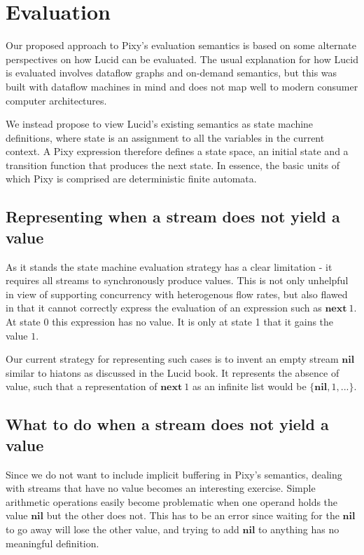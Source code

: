 \documentclass{scrartcl}
\begin{document}
    \section{Evaluation}

    Our proposed approach to Pixy's evaluation semantics is based on some alternate perspectives on how Lucid can be evaluated. The usual explanation for how Lucid is evaluated involves dataflow graphs and on-demand semantics, but this was built with dataflow machines in mind and does not map well to modern consumer computer architectures.

    We instead propose to view Lucid's existing semantics as state machine definitions, where state is an assignment to all the variables in the current context. A Pixy expression therefore defines a state space, an initial state and a transition function that produces the next state. In essence, the basic units of which Pixy is comprised are deterministic finite automata.
    
    \subsection{Representing when a stream does not yield a value}
    
    As it stands the state machine evaluation strategy has a clear limitation - it requires all streams to synchronously produce values. This is not only unhelpful in view of supporting concurrency with heterogenous flow rates, but also flawed in that it cannot correctly express the evaluation of an expression such as $\textbf{next}\ 1$. At state 0 this expression has no value. It is only at state 1 that it gains the value $1$.
    
    Our current strategy for representing such cases is to invent an empty stream $\textbf{nil}$ similar to hiatons as discussed in the Lucid book. It represents the absence of value, such that a representation of $\textbf{next}\ 1$ as an infinite list would be $\{\textbf{nil}, 1, ...\}$.
    
    \subsection{What to do when a stream does not yield a value}
    
    \label{subsec:async}
    
    Since we do not want to include implicit buffering in Pixy's semantics, dealing with streams that have no value becomes an interesting exercise. Simple arithmetic operations easily become problematic when one operand holds the value $\textbf{nil}$ but the other does not. This has to be an error since waiting for the $\textbf{nil}$ to go away will lose the other value, and trying to add $\textbf{nil}$ to anything has no meaningful definition.
    
\end{document}
